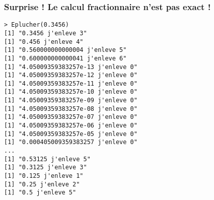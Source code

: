 \documentclass[10pt]{beamer}
\begin{document}
\begin{frame}[fragile]
  \frametitle{Surprise ! Le calcul fractionnaire n'est pas exact !}
\begin{lstlisting}
> Eplucher(0.3456)
[1] "0.3456 j'enleve 3"
[1] "0.456 j'enleve 4"
[1] "0.560000000000004 j'enleve 5"
[1] "0.600000000000041 j'enleve 6"
[1] "4.05009359383257e-13 j'enleve 0"
[1] "4.05009359383257e-12 j'enleve 0"
[1] "4.05009359383257e-11 j'enleve 0"
[1] "4.05009359383257e-10 j'enleve 0"
[1] "4.05009359383257e-09 j'enleve 0"
[1] "4.05009359383257e-08 j'enleve 0"
[1] "4.05009359383257e-07 j'enleve 0"
[1] "4.05009359383257e-06 j'enleve 0"
[1] "4.05009359383257e-05 j'enleve 0"
[1] "0.000405009359383257 j'enleve 0"
...
[1] "0.53125 j'enleve 5"
[1] "0.3125 j'enleve 3"
[1] "0.125 j'enleve 1"
[1] "0.25 j'enleve 2"
[1] "0.5 j'enleve 5"  
\end{lstlisting}
\end{frame}

 \questionSlide

 \appendix
 \backupSlides





\end{document}
